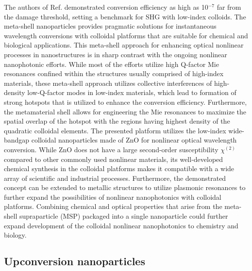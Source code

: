 \documentclass[journal=chreay,manuscript=review]{achemso}
\begin{document}
The authors of Ref. demonstrated conversion efficiency as high as 10$^{-7}$ far from the damage threshold, setting a benchmark for SHG with low-index colloids. The meta-shell nanoparticles provides pragmatic solutions for instantaneous wavelength conversions with colloidal platforms that are suitable for chemical and biological applications. This meta-shell approach for enhancing optical nonlinear processes in nanostructures is in sharp contrast with the ongoing nonlinear nanophotonic efforts. While most of the efforts utilize high Q-factor Mie resonances confined within the structures usually comprised of high-index materials, these meta-shell approach utilizes collective interferences of high-density low-Q-factor modes in low-index materials, which lead to formation of strong hotspots that is utilized to enhance the conversion efficiency. Furthermore, the metamaterial shell allows for engineering the Mie resonances  to maximize the spatial overlap of the hotspot with the regions having highest  density of the quadratic colloidal elements. The presented platform utilizes the low-index wide-bandgap colloidal nanoparticles made of ZnO for nonlinear optical wavelength conversion. While ZnO does not have a large second-order susceptibility $\chi^{(2)}$ compared to other commonly used nonlinear materials, its well-developed chemical synthesis in the colloidal platforms makes it compatible with a wide array of scientific and industrial processes. Furthermore, the demonstrated concept
can be extended to metallic structures to utilize plasmonic resonances to further expand the possibilities of nonlinear nanophotonics with colloidal platforms. Combining chemical and optical properties that arise from the  meta-shell supraparticle (MSP)  packaged into a single nanoparticle could further expand development of the colloidal nonlinear nanophotonics to chemistry and biology.

\subsection{Upconversion nanoparticles}
\end{document}
